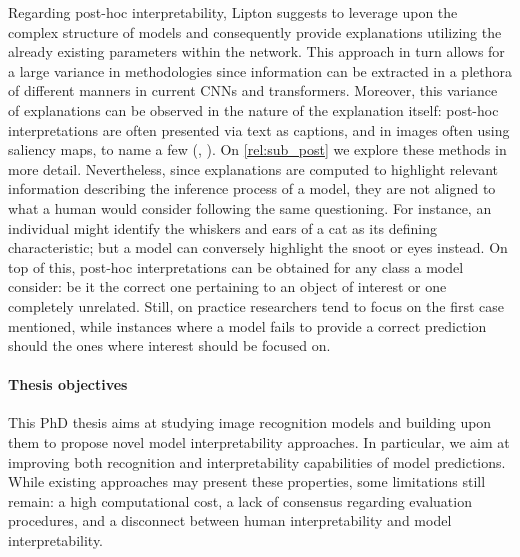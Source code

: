\noindent Regarding post-hoc interpretability, Lipton suggests to leverage upon the complex 
structure of models and consequently provide explanations utilizing the already existing parameters 
within the network. This approach in turn allows for a large variance in methodologies since 
information can be extracted in a plethora of different manners in current CNNs and transformers. 
Moreover, this variance of explanations can be observed in the nature of the explanation itself: 
post-hoc interpretations are often presented via text as captions, and in images often using 
saliency maps, to name a few (\cite{bach2015pixel}, \cite{ribeiro2016should} 
\cite{zhou2016learning}). On \autoref{rel:sub_post} we explore these methods in more detail. 
Nevertheless, since explanations are computed to highlight relevant information describing the 
inference process of a model, they are not aligned to what a human would consider following the 
same questioning. For instance, an individual might identify the whiskers and ears of a cat as its 
defining characteristic; but a model can conversely highlight the snoot or eyes instead. On top of 
this, post-hoc interpretations can be obtained for any class a model consider: be it the correct 
one pertaining to an object of interest or one completely unrelated. Still, on practice researchers 
tend to focus on the first case mentioned, while instances where a model fails to provide a correct 
prediction should the ones where interest should be focused on.\\


\paragraph{Thesis objectives} This PhD thesis aims at studying image recognition models and 
building upon them to propose novel model interpretability approaches. In particular, we aim at 
improving both recognition and interpretability capabilities of model predictions. While existing 
approaches may present these properties, some limitations still remain: a high 
computational cost, a lack of consensus regarding evaluation procedures, and a disconnect between 
human interpretability and model interpretability.\\

